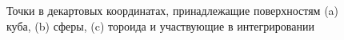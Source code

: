 \begin{figure}[h]
\begin{subfigure}{0.49\linewidth}
        \caption{}
    \end{subfigure}
    \label{fig:scatter}
    \caption{Точки в декартовых координатах, принадлежащие поверхностям
    (a) куба, (b) сферы, (c) тороида и участвующие в интегрировании}
\end{figure}






